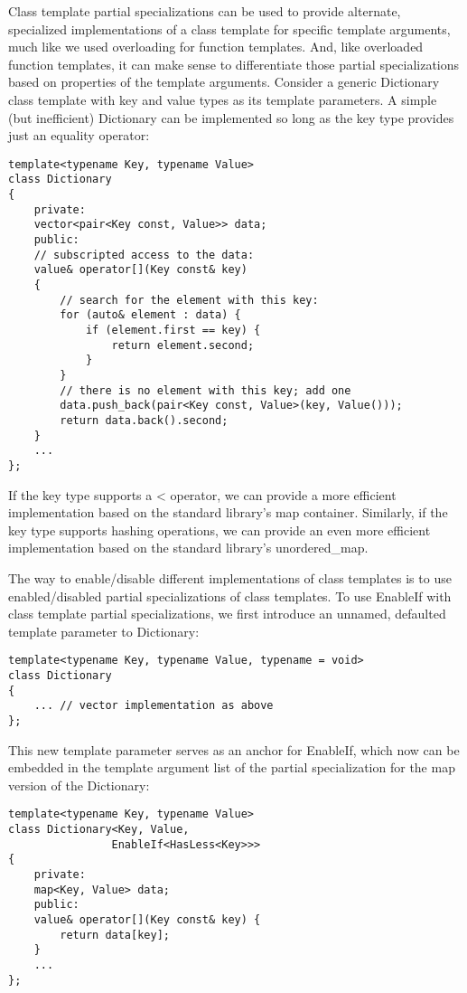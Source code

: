 
Class template partial specializations can be used to provide alternate, specialized implementations of a class template for specific template arguments, much like we used overloading for function templates. And, like overloaded function templates, it can make sense to differentiate those partial specializations based on properties of the template arguments. Consider a generic Dictionary class template with key and value types as its template parameters. A simple (but inefficient) Dictionary can be implemented so long as the key type provides just an equality operator:

\begin{lstlisting}[style=styleCXX]
template<typename Key, typename Value>
class Dictionary
{
	private:
	vector<pair<Key const, Value>> data;
	public:
	// subscripted access to the data:
	value& operator[](Key const& key)
	{
		// search for the element with this key:
		for (auto& element : data) {
			if (element.first == key) {
				return element.second;
			}
		}
		// there is no element with this key; add one
		data.push_back(pair<Key const, Value>(key, Value()));
		return data.back().second;
	}
	...
};
\end{lstlisting}

If the key type supports a < operator, we can provide a more efficient implementation based on the standard library’s map container. Similarly, if the key type supports hashing operations, we can provide an even more efficient implementation based on the standard library’s unordered\_map.


The way to enable/disable different implementations of class templates is to use enabled/disabled partial specializations of class templates. To use EnableIf with class template partial specializations, we first introduce an unnamed, defaulted template parameter to Dictionary:

\begin{lstlisting}[style=styleCXX]
template<typename Key, typename Value, typename = void>
class Dictionary
{
	... // vector implementation as above
};
\end{lstlisting}

This new template parameter serves as an anchor for EnableIf, which now can be embedded in the template argument list of the partial specialization for the map version of the Dictionary:

\begin{lstlisting}[style=styleCXX]
template<typename Key, typename Value>
class Dictionary<Key, Value,
				EnableIf<HasLess<Key>>>
{
	private:
	map<Key, Value> data;
	public:
	value& operator[](Key const& key) {
		return data[key];
	}
	...
};
\end{lstlisting}

